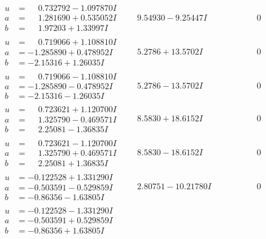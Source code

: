 \documentclass[1p]{elsarticle_modified}
\theoremstyle{definition}
\begin{document}
$$\begin{array}{c|c|c}
\begin{aligned}
u &= \phantom{-}0.732792 - 1.097870 I \\
a &= \phantom{-}1.281690 + 0.535052 I \\
b &= \phantom{-}1.97203 + 1.33997 I\end{aligned}
 & \phantom{-}9.54930 - 9.25447 I & \phantom{-0.000000 } 0 \\ \hline\begin{aligned}
u &= \phantom{-}0.719066 + 1.108810 I \\
a &= -1.285890 + 0.478952 I \\
b &= -2.15316 + 1.26035 I\end{aligned}
 & \phantom{-}5.2786 + 13.5702 I & \phantom{-0.000000 } 0 \\ \hline\begin{aligned}
u &= \phantom{-}0.719066 - 1.108810 I \\
a &= -1.285890 - 0.478952 I \\
b &= -2.15316 - 1.26035 I\end{aligned}
 & \phantom{-}5.2786 - 13.5702 I & \phantom{-0.000000 } 0 \\ \hline\begin{aligned}
u &= \phantom{-}0.723621 + 1.120700 I \\
a &= \phantom{-}1.325790 - 0.469571 I \\
b &= \phantom{-}2.25081 - 1.36835 I\end{aligned}
 & \phantom{-}8.5830 + 18.6152 I & \phantom{-0.000000 } 0 \\ \hline\begin{aligned}
u &= \phantom{-}0.723621 - 1.120700 I \\
a &= \phantom{-}1.325790 + 0.469571 I \\
b &= \phantom{-}2.25081 + 1.36835 I\end{aligned}
 & \phantom{-}8.5830 - 18.6152 I & \phantom{-0.000000 } 0 \\ \hline\begin{aligned}
u &= -0.122528 + 1.331290 I \\
a &= -0.503591 - 0.529859 I \\
b &= -0.86356 - 1.63805 I\end{aligned}
 & \phantom{-}2.80751 - 10.21780 I & \phantom{-0.000000 } 0 \\ \hline\begin{aligned}
u &= -0.122528 - 1.331290 I \\
a &= -0.503591 + 0.529859 I \\
b &= -0.86356 + 1.63805 I\end{aligned}

\end{array}$$
\end{document}
